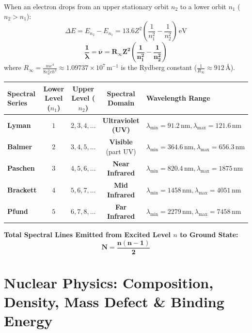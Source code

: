 \documentclass[10pt,a4paper]{article}
\begin{document}
\begin{formulabox}
When an electron drops from an upper stationary orbit $n_2$ to a lower orbit $n_1$ ($n_2 > n_1$):
\begin{equation}
  \Delta E = E_{n_2} - E_{n_1} = 13.6 Z^2 \left(\frac{1}{n_1^2} - \frac{1}{n_2^2}\right)\,\mathrm{eV}
\end{equation}
\begin{equation}
  \mathbf{\frac{1}{\lambda} = \overline{\nu} = R_\infty Z^2 \left(\frac{1}{n_1^2} - \frac{1}{n_2^2}\right)}
\end{equation}
where $R_\infty = \frac{m e^4}{8\varepsilon_0^2 c h^3} \approx 1.09737 \times 10^7\,\mathrm{m}^{-1}$ is the Rydberg constant ($\frac{1}{R_\infty} \approx 912\,\text{\AA}$).
\begin{center}
\begin{tabularx}{\linewidth}{|l|c|c|c|Y|}
\hline
\textbf{Spectral Series} & \textbf{Lower Level ($n_1$)} & \textbf{Upper Level ($n_2$)} & \textbf{Spectral Domain} & \textbf{Wavelength Range} \\
\hline
\textbf{Lyman} & $1$ & $2, 3, 4, \dots$ & \textbf{Ultraviolet (UV)} & $\lambda_{\min} = 91.2\,\mathrm{nm}, \lambda_{\max} = 121.6\,\mathrm{nm}$ \\
\hline
\textbf{Balmer} & $2$ & $3, 4, 5, \dots$ & \textbf{Visible} (part UV) & $\lambda_{\min} = 364.6\,\mathrm{nm}, \lambda_{\max} = 656.3\,\mathrm{nm}$ \\
\hline
\textbf{Paschen} & $3$ & $4, 5, 6, \dots$ & \textbf{Near Infrared} & $\lambda_{\min} = 820.4\,\mathrm{nm}, \lambda_{\max} = 1875\,\mathrm{nm}$ \\
\hline
\textbf{Brackett} & $4$ & $5, 6, 7, \dots$ & \textbf{Mid Infrared} & $\lambda_{\min} = 1458\,\mathrm{nm}, \lambda_{\max} = 4051\,\mathrm{nm}$ \\
\hline
\textbf{Pfund} & $5$ & $6, 7, 8, \dots$ & \textbf{Far Infrared} & $\lambda_{\min} = 2279\,\mathrm{nm}, \lambda_{\max} = 7458\,\mathrm{nm}$ \\
\hline
\end{tabularx}
\end{center}
\textbf{Total Spectral Lines Emitted from Excited Level $n$ to Ground State:}
\begin{equation}
  \mathbf{N = \frac{n(n - 1)}{2}}
\end{equation}
\end{formulabox}

\section{Nuclear Physics: Composition, Density, Mass Defect \& Binding Energy}
\end{document}
